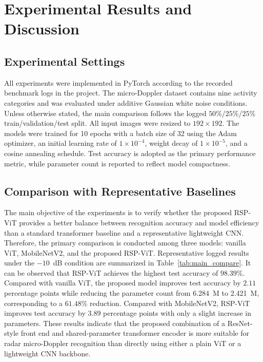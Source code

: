 \documentclass{svproc}
\begin{document}
\section{Experimental Results and Discussion}

\subsection{Experimental Settings}

All experiments were implemented in PyTorch according to the recorded benchmark logs in the project. The micro-Doppler dataset contains nine activity categories and was evaluated under additive Gaussian white noise conditions. Unless otherwise stated, the main comparison follows the logged $50\%/25\%/25\%$ train/validation/test split. All input images were resized to $192 \times 192$. The models were trained for 10 epochs with a batch size of 32 using the Adam optimizer, an initial learning rate of $1\times10^{-4}$, weight decay of $1\times10^{-5}$, and a cosine annealing schedule. Test accuracy is adopted as the primary performance metric, while parameter count is reported to reflect model compactness.

\subsection{Comparison with Representative Baselines}

The main objective of the experiments is to verify whether the proposed RSP-ViT provides a better balance between recognition accuracy and model efficiency than a standard transformer baseline and a representative lightweight CNN. Therefore, the primary comparison is conducted among three models: vanilla ViT, MobileNetV2, and the proposed RSP-ViT. Representative logged results under the $-10$~dB condition are summarized in Table~\ref{tab:main_compare}. It can be observed that RSP-ViT achieves the highest test accuracy of $98.39\%$. Compared with vanilla ViT, the proposed model improves test accuracy by $2.11$ percentage points while reducing the parameter count from 6.284~M to 2.421~M, corresponding to a $61.48\%$ reduction. Compared with MobileNetV2, RSP-ViT improves test accuracy by $3.89$ percentage points with only a slight increase in parameters. These results indicate that the proposed combination of a ResNet-style front end and shared-parameter transformer encoder is more suitable for radar micro-Doppler recognition than directly using either a plain ViT or a lightweight CNN backbone.
\end{document}
